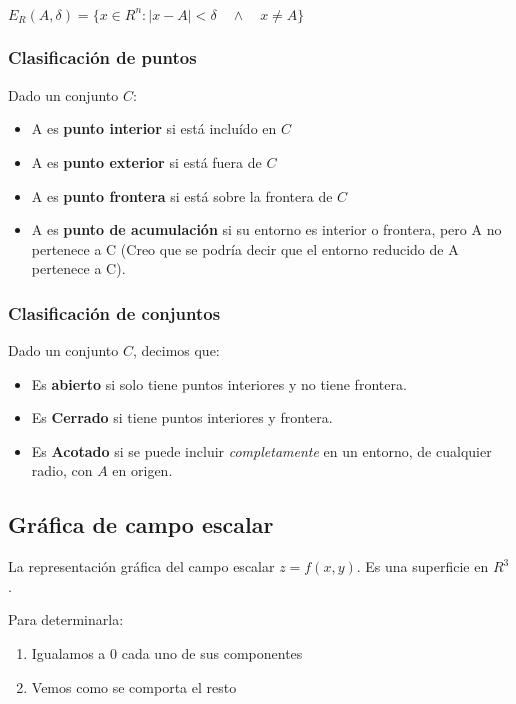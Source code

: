 \(E_R(A,\delta) = \{x \in R^{n}: |x-A| < \delta \quad \land \quad x \neq A\}\)


\subsubsection{Clasificación de puntos}

Dado un conjunto \(C\):

\begin{itemize}
    \item A es \textbf{punto interior} si está incluído en \(C\)
    \item A es \textbf{punto exterior} si está fuera de \(C\)
    \item A es \textbf{punto frontera} si está sobre la frontera de \(C\)
    \item A es \textbf{punto de acumulación} si su entorno es interior o 
    frontera, pero A no pertenece a C (Creo que se podría decir que el entorno 
    reducido de A pertenece a C).
\end{itemize}

\subsubsection{Clasificación de conjuntos}

Dado un conjunto \(C\), decimos que:

\begin{itemize}
    \item Es \textbf{abierto} si solo tiene puntos interiores y no tiene 
    frontera.
    \item Es \textbf{Cerrado} si tiene puntos interiores y frontera.
    \item Es \textbf{Acotado} si se puede incluir \textit{completamente} en un 
    entorno, de cualquier radio, con \(A\) en origen.
\end{itemize}

\subsection{Gráfica de campo escalar}

La representación gráfica del campo escalar \(z = f(x,y)\).
Es una superficie en \(R^{3}\).

Para determinarla:

\begin{enumerate}
    \item Igualamos a 0 cada uno de sus componentes
    \item Vemos como se comporta el resto
\end{enumerate}

